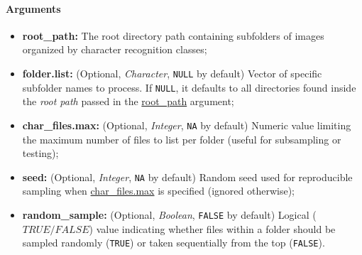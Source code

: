 \documentclass[
]{report}
\providecommand{\tightlist}{%
  \setlength{\itemsep}{0pt}\setlength{\parskip}{0pt}}
\begin{document}
\paragraph{Arguments}\label{arguments-2}

\hfill\break

\protect{}\label{func.img.file.get_list.args.root_path}
\begin{itemize}
\tightlist
\item
  \textbf{root\_path:} The root directory path containing subfolders of images organized by character recognition classes;
\end{itemize}

\protect{}\label{func.img.file.get_list.args.folder.list}
\begin{itemize}
\tightlist
\item
  \textbf{folder.list:} (Optional, \emph{Character}, \texttt{NULL} by default) Vector of specific subfolder names to process. If \texttt{NULL}, it defaults to all directories found inside the \emph{root path} passed in the \hyperref[func.img.file.get_list.args.root_path]{root\_path} argument;
\end{itemize}

\protect{}\label{func.img.file.get_list.args.char_files.max}
\begin{itemize}
\tightlist
\item
  \textbf{char\_files.max:} (Optional, \emph{Integer}, \texttt{NA} by default) Numeric value limiting the maximum number of files to list per folder (useful for subsampling or testing);
\end{itemize}

\protect{}\label{func.img.file.get_list.args.seed}
\begin{itemize}
\tightlist
\item
  \textbf{seed:} (Optional, \emph{Integer}, \texttt{NA} by default) Random seed used for reproducible sampling when \hyperref[func.img.file.get_list.args.char_files.max]{char\_files.max} is specified (ignored otherwise);
\end{itemize}

\protect{}\label{func.img.file.get_list.args.random_sample}
\begin{itemize}
\tightlist
\item
  \textbf{random\_sample:} (Optional, \emph{Boolean}, \texttt{FALSE} by default) Logical (\(TRUE / FALSE\)) value indicating whether files within a folder should be sampled randomly (\texttt{TRUE}) or taken sequentially from the top (\texttt{FALSE}).
\end{itemize}
\end{document}
